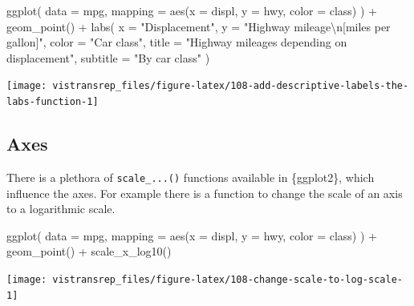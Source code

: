 \documentclass[]{book}
\newenvironment{Shaded}{}{}
\newcommand{\CharTok}[1]{\textcolor[rgb]{0.00,0.50,0.50}{#1}}
\newcommand{\DataTypeTok}[1]{#1}
\newcommand{\KeywordTok}[1]{\textcolor[rgb]{0.00,0.00,1.00}{#1}}
\newcommand{\NormalTok}[1]{#1}
\newcommand{\OperatorTok}[1]{#1}
\newcommand{\StringTok}[1]{\textcolor[rgb]{0.00,0.50,0.50}{#1}}
\begin{document}
\begin{Shaded}
\begin{Highlighting}[]
\KeywordTok{ggplot}\NormalTok{(}
  \DataTypeTok{data =}\NormalTok{ mpg,}
  \DataTypeTok{mapping =} \KeywordTok{aes}\NormalTok{(}\DataTypeTok{x =}\NormalTok{ displ, }\DataTypeTok{y =}\NormalTok{ hwy, }\DataTypeTok{color =}\NormalTok{ class)}
\NormalTok{) }\OperatorTok{+}
\StringTok{  }\KeywordTok{geom_point}\NormalTok{() }\OperatorTok{+}
\StringTok{  }\KeywordTok{labs}\NormalTok{(}
    \DataTypeTok{x =} \StringTok{"Displacement"}\NormalTok{,}
    \DataTypeTok{y =} \StringTok{"Highway mileage}\CharTok{\textbackslash{}n}\StringTok{[miles per gallon]"}\NormalTok{,}
    \DataTypeTok{color =} \StringTok{"Car class"}\NormalTok{,}
    \DataTypeTok{title =} \StringTok{"Highway mileages depending on displacement"}\NormalTok{,}
    \DataTypeTok{subtitle =} \StringTok{"By car class"}
\NormalTok{  )}
\end{Highlighting}
\end{Shaded}

\begin{flushright}\texttt{[image: vistransrep\_files/figure-latex/108-add-descriptive-labels-the-labs-function-1]} \end{flushright}

\hypertarget{axes}{%
\subsection{Axes}\label{axes}}

There is a plethora of \texttt{scale\_...()} functions available in \{ggplot2\}, which influence the axes.
For example there is a function to change the scale of an axis to a logarithmic scale.

\begin{Shaded}
\begin{Highlighting}[]
\KeywordTok{ggplot}\NormalTok{(}
  \DataTypeTok{data =}\NormalTok{ mpg,}
  \DataTypeTok{mapping =} \KeywordTok{aes}\NormalTok{(}\DataTypeTok{x =}\NormalTok{ displ, }\DataTypeTok{y =}\NormalTok{ hwy, }\DataTypeTok{color =}\NormalTok{ class)}
\NormalTok{) }\OperatorTok{+}
\StringTok{  }\KeywordTok{geom_point}\NormalTok{() }\OperatorTok{+}
\StringTok{  }\KeywordTok{scale_x_log10}\NormalTok{()}
\end{Highlighting}
\end{Shaded}

\begin{flushright}\texttt{[image: vistransrep\_files/figure-latex/108-change-scale-to-log-scale-1]} \end{flushright}
\end{document}
